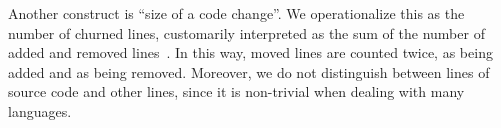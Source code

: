 Another construct %
is ``size of a code change''.
We operationalize this as the number of churned lines, customarily 
interpreted as the sum of the number of added and removed lines~\cite{GigerPG}. 
In this way, moved lines are counted twice, as being added and as being removed.
Moreover, we do not distinguish between lines of source code and other lines, 
since it is non-trivial when dealing with many languages.





